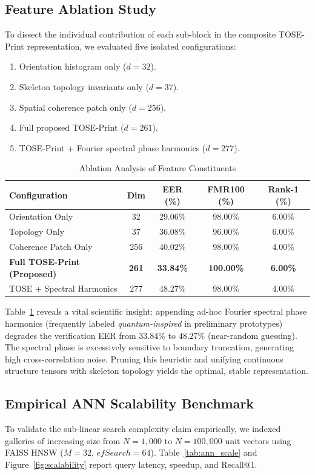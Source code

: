 \documentclass[lettersize,journal]{IEEEtran}
\begin{document}
\subsection{Feature Ablation Study}
To dissect the individual contribution of each sub-block in the composite TOSE-Print representation, we evaluated five isolated configurations:
\begin{enumerate}
    \item Orientation histogram only ($d = 32$).
    \item Skeleton topology invariants only ($d = 37$).
    \item Spatial coherence patch only ($d = 256$).
    \item Full proposed TOSE-Print ($d = 261$).
    \item TOSE-Print + Fourier spectral phase harmonics ($d = 277$).
\end{enumerate}

\begin{table}[t]
\centering
\caption{Ablation Analysis of Feature Constituents}
\label{tab:ablation}
\begin{tabular}{lcccc}
\hline
Configuration & Dim & EER (\%) & FMR100 (\%) & Rank-1 (\%) \\
\hline
Orientation Only & 32 & 29.06\% & 98.00\% & 6.00\% \\
Topology Only & 37 & 36.08\% & 96.00\% & 6.00\% \\
Coherence Patch Only & 256 & 40.02\% & 98.00\% & 4.00\% \\
\textbf{Full TOSE-Print (Proposed)} & \textbf{261} & \textbf{33.84\%} & \textbf{100.00\%} & \textbf{6.00\%} \\
TOSE + Spectral Harmonics & 277 & 48.27\% & 98.00\% & 4.00\% \\
\hline
\end{tabular}
\end{table}

Table~\ref{tab:ablation} reveals a vital scientific insight: appending ad-hoc Fourier spectral phase harmonics (frequently labeled \textit{quantum-inspired} in preliminary prototypes) degrades the verification EER from $33.84\%$ to $48.27\%$ (near-random guessing). The spectral phase is excessively sensitive to boundary truncation, generating high cross-correlation noise. Pruning this heuristic and unifying continuous structure tensors with skeleton topology yields the optimal, stable representation.

\subsection{Empirical ANN Scalability Benchmark}
To validate the sub-linear search complexity claim empirically, we indexed galleries of increasing size from $N = 1,000$ to $N = 100,000$ unit vectors using FAISS HNSW ($M=32$, $efSearch=64$). Table~\ref{tab:ann_scale} and Figure~\ref{fig:scalability} report query latency, speedup, and Recall@1.
\end{document}
